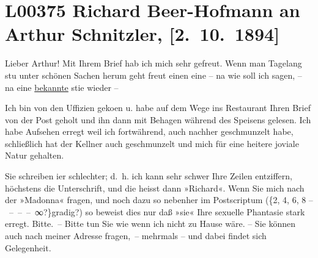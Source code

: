 

\section[Richard Beer-Hofmann an Arthur Schnitzler, {[}2. 10. 1894{]}]{L00375 Richard Beer-Hofmann an Arthur Schnitzler, {[}2. 10. 1894{]}}
\nopagebreak{}
\rehead{ }\normalsize\beginnumbering{}
\toendnotes[C]{\smallbreak\pagebreak[2]}
\toendnotes[C]{\smallbreak}
\pstart
           \noindent{}{\pb}Lieber Arthur! Mit Ihrem Brief hab ich mich sehr gefreut. Wenn man
               Tagelang stu{\geminationm} unter schönen Sachen herum geht freut
               einen eine – na wie soll ich sagen, – na eine \uline{bekannte} sti{\geminationm}e wieder –\pend
           
\pstart
           Ich bin von den Uffizien geko{\geminationm}en u. habe auf dem Wege ins Restaurant {\pb}Ihren Brief von der Post geholt und
               ihn dann mit Behagen während des Speisens gelesen. Ich habe Aufsehen erregt weil ich
               fortwährend, auch nachher geschmunzelt habe, schließlich hat der Kellner auch
               geschmunzelt und mich für eine heitere joviale Natur gehalten.\pend
           
\pstart
           Sie schreiben i{\geminationm}er schlechter; d. h. ich kann sehr
               schwer {\pb}Ihre Zeilen entziffern,
               höchstens die Unterschrift, und die heisst dann »Richard«. Wenn Sie mich nach der
               »Madonna«
               fragen, und noch dazu so nebenher im Postscriptum ({\{}2, 4, 6, 8 – – – – ∞?{\}}gradig?) so beweist dies nur daß »sie« Ihre
               sexuelle Phantasie stark erregt. Bitte. – Bitte tun Sie wie wenn ich nicht zu Hause
               wäre. – Sie können auch nach meiner Adresse fragen, – mehrmals – {\pb}und dabei findet sich
               Gelegenheit.\pend
           
